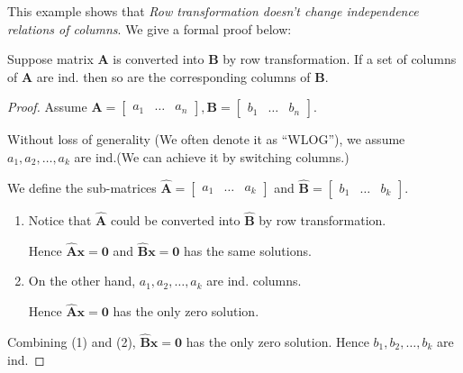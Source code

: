 This example shows that \emph{Row transformation doesn't change independence relations of columns}. We give a formal proof below:
\begin{proposition}
Suppose matrix $\bm A$ is converted into $\bm B$ by row transformation. If a set of columns of $\bm A$ are ind. then so are the corresponding columns of $\bm B$.
\end{proposition}
\begin{proof}
Assume $\bm A = \left[\begin{array}{c|c|c}
a_1&\dots&a_n
\end{array}\right], \bm B = \left[\begin{array}{c|c|c}
b_1&\dots&b_n
\end{array}\right]$.

Without loss of generality (We often denote it as ``WLOG''), we assume $a_1,a_2,\dots,a_k$ are ind.(We can achieve it by switching columns.)

We define the sub-matrices $\bm{\hat{A}} = \left[\begin{array}{c|c|c}
a_1&\dots&a_k
\end{array}\right]$ and $\bm{\hat{B}} = \left[\begin{array}{c|c|c}
b_1&\dots&b_k
\end{array}\right]$.

\begin{enumerate}
\item
Notice that $\bm{\hat{A}}$ could be converted into $\bm{\hat{B}}$ by row transformation.

Hence $\bm{\hat{A}x}=\bm 0$ and $\bm{\hat{B}x}=\bm 0$ has the same solutions.
\item
On the other hand, $a_1,a_2,\dots,a_k$ are ind. columns.

Hence $\bm{\hat{A}x}=\bm 0$ has the only zero solution.
\end{enumerate}
Combining (1) and (2), $\bm{\hat{B}x}=\bm 0$ has the only zero solution. Hence $b_1,b_2,\dots,b_k$ are ind.
\end{proof}

